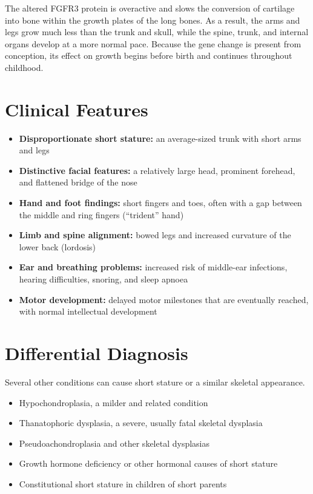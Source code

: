 The altered FGFR3 protein is overactive and slows the conversion of cartilage into bone within the growth plates of the long bones. As a result, the arms and legs grow much less than the trunk and skull, while the spine, trunk, and internal organs develop at a more normal pace. Because the gene change is present from conception, its effect on growth begins before birth and continues throughout childhood.

\section*{Clinical Features}
\begin{itemize}
    \item \textbf{Disproportionate short stature:} an average-sized trunk with short arms and legs
    \item \textbf{Distinctive facial features:} a relatively large head, prominent forehead, and flattened bridge of the nose
    \item \textbf{Hand and foot findings:} short fingers and toes, often with a gap between the middle and ring fingers (``trident'' hand)
    \item \textbf{Limb and spine alignment:} bowed legs and increased curvature of the lower back (lordosis)
    \item \textbf{Ear and breathing problems:} increased risk of middle-ear infections, hearing difficulties, snoring, and sleep apnoea
    \item \textbf{Motor development:} delayed motor milestones that are eventually reached, with normal intellectual development
\end{itemize}

\section*{Differential Diagnosis}
Several other conditions can cause short stature or a similar skeletal appearance.

\begin{itemize}
    \item Hypochondroplasia, a milder and related condition
    \item Thanatophoric dysplasia, a severe, usually fatal skeletal dysplasia
    \item Pseudoachondroplasia and other skeletal dysplasias
    \item Growth hormone deficiency or other hormonal causes of short stature
    \item Constitutional short stature in children of short parents
\end{itemize}

